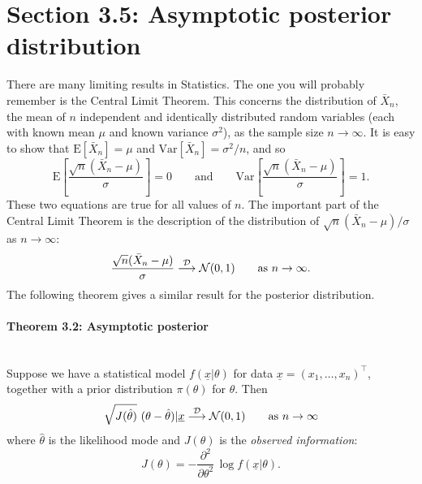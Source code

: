 \clearpage


\section{Section 3.5: Asymptotic posterior distribution}
There are many limiting results in Statistics. The one you will probably remember is the Central Limit Theorem. This concerns the distribution of $\bar X_n$, the mean of $n$ independent and identically distributed random variables (each with known mean $\mu$ and known variance $\sigma^2$), as the sample size $n\to\infty$. It is easy to show that $\text{E}[\bar X_n]=\mu$ and $\text{Var}[\bar X_n]=\sigma^2/n$, and so 
$$
\text{E}\left[\frac{\sqrt{n}(\bar{X}_{n}-\mu)}{\sigma}\right] = 0 \qquad \mathrm{and} \qquad \text{Var}\left[\frac{\sqrt{n}(\bar{X}_{n}-\mu)}{\sigma}\right]=1.
$$
These two equations are true for all values of $n$.  The important part of the Central Limit Theorem is the description of the distribution of $\sqrt{n}(\bar{X}_{n}-\mu)/\sigma$ as $n \to \infty$: 
\begin{equation*}
\frac{\sqrt{n}(\bar X_n-\mu)}{\sigma}\stackrel{\cal D} \longrightarrow
\mathcal{N}(0,1)\quad\quad\text{as }n\to\infty.
\end{equation*}
The following theorem gives a similar result for the posterior
distribution. 

\paragraph{Theorem 3.2: Asymptotic posterior}{\label{theorem: asymptotic posterior} ~\\ 
Suppose we have a statistical model $f(\underline{x}|\theta)$ for data
$\underline{x} = (x_1, \ldots, x_n)^\top$, together with a prior distribution $\pi(\theta)$ for
$\theta$. Then
$$\sqrt{J(\hat{\theta})}~(\theta-\hat{\theta})|\underline{x} \stackrel{\cal D}
  \longrightarrow \mathcal{N}(0,1)
  \quad\quad\text{as }n\to\infty $$
    where $\hat{\theta}$ is the likelihood mode and $J(\theta)$
    is the \emph{observed information}:
    $$ J(\theta)=-\frac{\partial^2}{\partial\theta^2}\, \log f(\underline{x}|\theta).$$}
\clearpage
